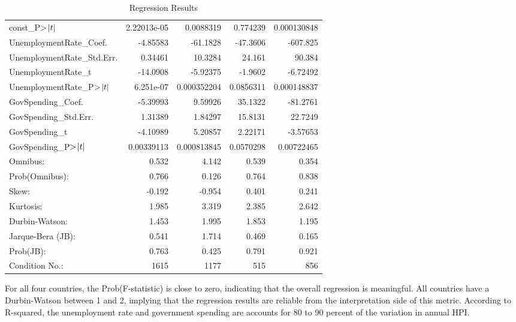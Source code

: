 \documentclass[11pt]{article}
\begin{document}
\begin{table}[]
\begin{tabular}{lrrrr}
               const\_P$>\abs{t}$ &  2.22013e-05 &    0.0088319 &    0.774239 &  0.000130848 \\
    UnemploymentRate\_Coef. &     -4.85583 &     -61.1828 &    -47.3606 &     -607.825 \\
 UnemploymentRate\_Std.Err. &      0.34461 &      10.3284 &      24.161 &       90.384 \\
        UnemploymentRate\_t &     -14.0908 &     -5.92375 &     -1.9602 &     -6.72492 \\
    UnemploymentRate\_P$>\abs{t}$ &    6.251e-07 &  0.000352204 &   0.0856311 &  0.000148837 \\
         GovSpending\_Coef. &     -5.39993 &      9.59926 &     35.1322 &     -81.2761 \\
      GovSpending\_Std.Err. &      1.31389 &      1.84297 &     15.8131 &      22.7249 \\
             GovSpending\_t &     -4.10989 &      5.20857 &     2.22171 &     -3.57653 \\
         GovSpending\_P$>\abs{t}$&   0.00339113 &  0.000813845 &   0.0570298 &   0.00722465 \\
                  Omnibus: &        0.532 &        4.142 &       0.539 &        0.354 \\
            Prob(Omnibus): &        0.766 &        0.126 &       0.764 &        0.838 \\
                     Skew: &       -0.192 &       -0.954 &       0.401 &        0.241 \\
                 Kurtosis: &        1.985 &        3.319 &       2.385 &        2.642 \\
            Durbin-Watson: &        1.453 &        1.995 &       1.853 &        1.195 \\
         Jarque-Bera (JB): &        0.541 &        1.714 &       0.469 &        0.165 \\
                 Prob(JB): &        0.763 &        0.425 &       0.791 &        0.921 \\
            Condition No.: &         1615 &         1177 &         515 &          856 \\
\bottomrule
\end{tabular}
\caption{Regression Results}
\label{tab:regression_results}
\end{table}

For all four countries, the Prob(F-statistic) is close to zero, indicating that the overall regression is meaningful. All countries have a Durbin-Watson between 1 and 2, implying that the regression results are reliable from the interpretation side of this metric. According to R-squared, the unemployment rate and government spending are accounts for 80 to 90 percent of the variation in annual HPI. 
\end{document}
